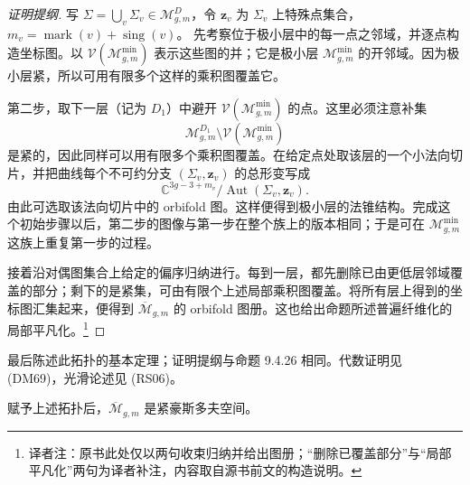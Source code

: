 \begin{proof}[证明提纲]
写 $\Sigma=\bigcup_v\Sigma_v\in\mathcal M_{g,m}^D$，令 $\boldsymbol z_v$ 为
$\Sigma_v$ 上特殊点集合，$m_v=\operatorname{mark}(v)+\operatorname{sing}(v)$。
先考察位于极小层中的每一点之邻域，并逐点构造坐标图。以
$\mathcal V(\mathcal M_{g,m}^{\min})$ 表示这些图的并；它是极小层
$\mathcal M_{g,m}^{\min}$ 的开邻域。因为极小层紧，所以可用有限多个这样的乘积图覆盖它。

第二步，取下一层（记为 $D_1$）中避开
$\mathcal V(\mathcal M_{g,m}^{\min})$ 的点。这里必须注意补集
\[
 \mathcal M_{g,m}^{D_1}\setminus
 \mathcal V(\mathcal M_{g,m}^{\min})
\]
是紧的，因此同样可以用有限多个乘积图覆盖。在给定点处取该层的一个小法向切片，并把曲线每个不可约分支
$(\Sigma_v,\boldsymbol z_v)$ 的总形变写成
\[
 \mathbb C^{3g-3+m_v}/
 \operatorname{Aut}(\Sigma_v,\boldsymbol z_v).
\]
由此可选取该法向切片中的 orbifold 图。这样便得到极小层的法锥结构。完成这个初始步骤以后，第二步的图像与第一步在整个族上的版本相同；于是可在
$\mathcal M_{g,m}^{\min}$ 这族上重复第一步的过程。

接着沿对偶图集合上给定的偏序归纳进行。每到一层，都先删除已由更低层邻域覆盖的部分；剩下的是紧集，可由有限个上述局部乘积图覆盖。将所有层上得到的坐标图汇集起来，便得到
$\overline{\mathcal M}_{g,m}$ 的 orbifold 图册。这也给出命题所述普遍纤维化的局部平凡化。\footnote{译者注：原书此处仅以两句收束归纳并给出图册；“删除已覆盖部分”与“局部平凡化”两句为译者补注，内容取自源书前文的构造说明。}
\end{proof}

最后陈述此拓扑的基本定理；证明提纲与命题 9.4.26 相同。代数证明见 (DM69)，光滑论述见 (RS06)。

\begin{theorem}\label{thm:deligne-mumford-compact-hausdorff}
赋予上述拓扑后，$\overline{\mathcal M}_{g,m}$ 是紧豪斯多夫空间。
\end{theorem}


